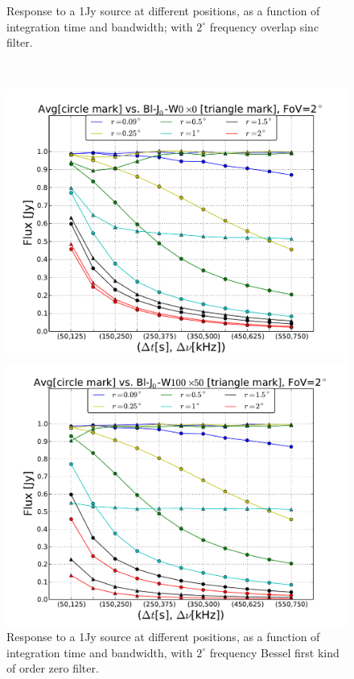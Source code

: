 \documentclass[useAMS,usenatbib]{mn2e}
\begin{document}
\begin{figure}
\begin{minipage}{0.36\linewidth}
    \caption{Response to a 1Jy source at different positions, as a function of integration time and bandwidth; with $2^{\circ}$ frequency 
 overlap sinc filter.}
    \label{fig:max-integ-timefreq-sinc-w100x50-fov2}\end{minipage}\\
\begin{minipage}{0.36\linewidth}\includegraphics[width=1\textwidth]{./Figures/max-integ-timefreq-bessel-w1x1-fov2.pdf}
      \caption{Response to a 1Jy source at different positions, as a function of integration time and bandwidth, with $2^{\circ}$ frequency 
Bessel first kind of order zero filter.}
      \label{fig:max-integ-timefreq-bessel-w1x1-fov2}\end{minipage}
\hspace{1cm}
\begin{minipage}{0.36\linewidth}\includegraphics[width=1\textwidth]{./Figures/max-integ-timefreq-bessel-w100x50-fov2.pdf}

\end{minipage}
\end{figure}
\end{document}
